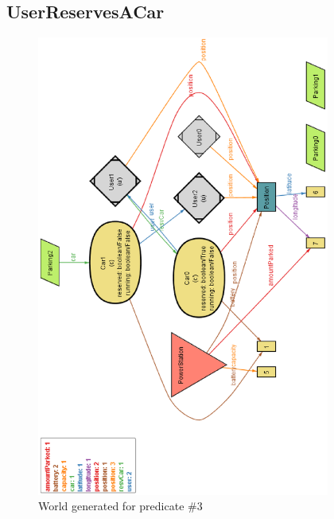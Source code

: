 \clearpage
\subsection{UserReservesACar}
\begin{figure}[h]
	\centering
	\includegraphics[height=15.2cm,keepaspectratio]{figures/world_generated_reservation.eps}
	\caption{World generated for predicate \#3}
	\label{fig:world_generated_reservation}
\end{figure}
